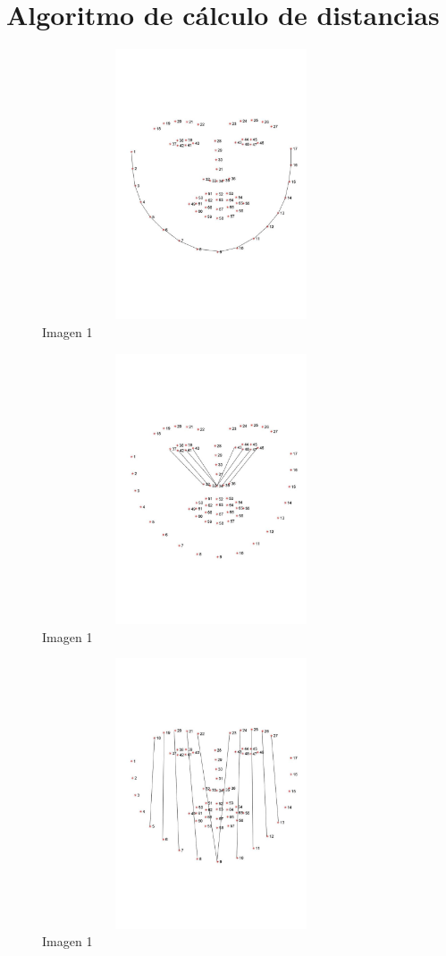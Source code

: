 \documentclass{article}
\begin{document}
\section{Algoritmo de cálculo de distancias}

\begin{figure}[H]
  \centering
  \includegraphics[width=100mm, height=80mm]{images/border_distances.jpg}
  \caption{Imagen 1}
\end{figure}


\begin{figure}[H]
  \centering
  \includegraphics[width=100mm, height=80mm]{images/cheekbone_distances.jpg}
  \caption{Imagen 1}
\end{figure}


\begin{figure}[H]
  \centering
  \includegraphics[width=100mm, height=80mm]{images/height_distances.jpg}
  \caption{Imagen 1}
\end{figure}
\end{document}
